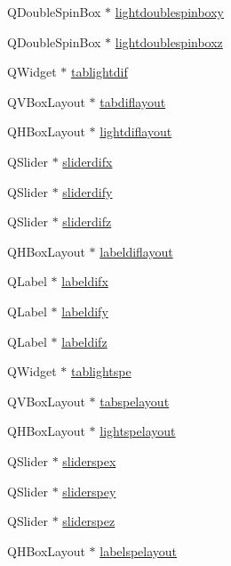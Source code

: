 \begin{DoxyCompactItemize}
\item 
Q\+Double\+Spin\+Box $\ast$ \hyperlink{class_mondock_a5829d9ba58222d9ec1905d9b81efeea2}{lightdoublespinboxy}
\item 
Q\+Double\+Spin\+Box $\ast$ \hyperlink{class_mondock_a7f9c9c2b765d28670aac280b38773ee9}{lightdoublespinboxz}
\item 
Q\+Widget $\ast$ \hyperlink{class_mondock_a7e42b87b7c1088da35395d5f1ef690d8}{tablightdif}
\item 
Q\+V\+Box\+Layout $\ast$ \hyperlink{class_mondock_a2691df29ebeefa273d759a15eb4c9f51}{tabdiflayout}
\item 
Q\+H\+Box\+Layout $\ast$ \hyperlink{class_mondock_a82bd5ea86bfd95368bdef210a807b1c4}{lightdiflayout}
\item 
Q\+Slider $\ast$ \hyperlink{class_mondock_a1d4f04858d8142be0a35b1aad9f14345}{sliderdifx}
\item 
Q\+Slider $\ast$ \hyperlink{class_mondock_a61a2ab20f30425efa13abc19241dfcb7}{sliderdify}
\item 
Q\+Slider $\ast$ \hyperlink{class_mondock_af68d00a8f6995732dc8f5861b1b64de2}{sliderdifz}
\item 
Q\+H\+Box\+Layout $\ast$ \hyperlink{class_mondock_a2cc5ecc094ac129ac7cf6c70147b8d29}{labeldiflayout}
\item 
Q\+Label $\ast$ \hyperlink{class_mondock_adc2193f6756de65b0d3a3f5a3a0e7164}{labeldifx}
\item 
Q\+Label $\ast$ \hyperlink{class_mondock_ab869df2ebba1417ef476ae6df23084f3}{labeldify}
\item 
Q\+Label $\ast$ \hyperlink{class_mondock_ac4418e6866dac5b4917ed73f43ccbcaa}{labeldifz}
\item 
Q\+Widget $\ast$ \hyperlink{class_mondock_a99dad8f1fa710a564d0e8348e992372e}{tablightspe}
\item 
Q\+V\+Box\+Layout $\ast$ \hyperlink{class_mondock_af59762fb339ae8c0821fada75433e8fb}{tabspelayout}
\item 
Q\+H\+Box\+Layout $\ast$ \hyperlink{class_mondock_a9d565bf7d99d0dc112fedc26f21abf2d}{lightspelayout}
\item 
Q\+Slider $\ast$ \hyperlink{class_mondock_abd032f6caee1a61430b8f37fdf872c55}{sliderspex}
\item 
Q\+Slider $\ast$ \hyperlink{class_mondock_ab99848143e6941f878cb9328681d7690}{sliderspey}
\item 
Q\+Slider $\ast$ \hyperlink{class_mondock_a496a2a2470c9c96599cd491608544bf6}{sliderspez}
\item 
Q\+H\+Box\+Layout $\ast$ \hyperlink{class_mondock_ad034a6a1d416711fd87e9594a33d9ae4}{labelspelayout}

\end{DoxyCompactItemize}
